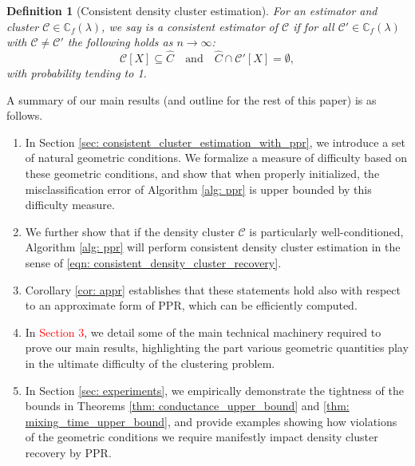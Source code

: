 \documentclass{article}
\newcommand{\1}{\mathbf{1}}
\newcommand{\Xbf}{X}             %
\newcommand{\Cbb}{\mathbb{C}}
\newcommand{\Cset}{\mathcal{C}}
\newcommand{\Cest}{\widehat{C}}
\newcommand{\ppr}{{\sc PPR}}
\theoremstyle{aldenthm}
\newtheorem{definition}{Definition}
\theoremstyle{aldenrmrk}
\begin{document}
\begin{definition}[Consistent density cluster estimation]
	\label{def: consistent_density_cluster_estimation}
	For an estimator \smash{$\Cest \subseteq \Xbf$} and cluster 
	$\Cset \in \Cbb_f(\lambda)$, we say \smash{$\Cest$} is a consistent
	estimator of $\Cset$ if for all $\Cset' \in \Cbb_f(\lambda)$ with $\Cset \not=
	\Cset'$ the following holds as $n \to \infty$: 
	\begin{equation}
	\label{eqn: consistent_density_cluster_recovery}
	\Cset[\Xbf] \subseteq \Cest \quad \text{and} \quad
	\Cest \cap \Cset'[\Xbf] = \emptyset,
	\end{equation}
	with probability tending to 1.
\end{definition}



A summary of our main results (and outline for the rest of this paper) is as
follows.  

\begin{enumerate}
	\item In Section \ref{sec: consistent_cluster_estimation_with_ppr}, we introduce a set of natural geometric conditions. We formalize a measure of difficulty based on these geometric conditions, and show that when properly initialized, the misclassification error of Algorithm \ref{alg: ppr} is upper bounded by this difficulty measure.
	
	\item We further show that if the density cluster $\Cset$ is particularly well-conditioned, Algorithm \ref{alg: ppr} will perform consistent density cluster estimation in the sense of \eqref{eqn: consistent_density_cluster_recovery}. 
	
	\item Corollary \ref{cor: appr} establishes that these statements hold also with respect to an approximate form of \ppr, which can be efficiently computed.
	
	\item In \textcolor{red}{Section 3}, we detail some of the main technical machinery required to prove our main results, highlighting the part various geometric quantities play in the ultimate difficulty of the clustering problem.
	
	\item In Section \ref{sec: experiments}, we empirically
	demonstrate the tightness of the bounds in Theorems \ref{thm: conductance_upper_bound} and \ref{thm: mixing_time_upper_bound}, and provide examples showing how violations of the geometric conditions we require manifestly
	impact density cluster recovery by \ppr.  
\end{enumerate}
\end{document}
